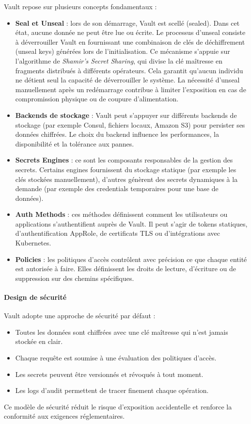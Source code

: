 Vault repose sur plusieurs concepts fondamentaux :

\begin{itemize}
	\item \textbf{Seal et Unseal} : lors de son démarrage, Vault est scellé (sealed). Dans cet état, aucune donnée ne peut être lue ou écrite. Le processus d’unseal consiste à déverrouiller Vault en fournissant une combinaison de clés de déchiffrement (unseal keys) générées lors de l’initialisation. Ce mécanisme s’appuie sur l’algorithme de \emph{Shamir’s Secret Sharing}, qui divise la clé maîtresse en fragments distribués à différents opérateurs. Cela garantit qu’aucun individu ne détient seul la capacité de déverrouiller le système. La nécessité d’unseal manuellement après un redémarrage contribue à limiter l’exposition en cas de compromission physique ou de coupure d’alimentation.
	\item \textbf{Backends de stockage} : Vault peut s’appuyer sur différents backends de stockage (par exemple Consul, fichiers locaux, Amazon S3) pour persister ses données chiffrées. Le choix du backend influence les performances, la disponibilité et la tolérance aux pannes.
	\item \textbf{Secrets Engines} : ce sont les composants responsables de la gestion des secrets. Certains engines fournissent du stockage statique (par exemple les clés stockées manuellement), d’autres génèrent des secrets dynamiques à la demande (par exemple des credentials temporaires pour une base de données).
	\item \textbf{Auth Methods} : ces méthodes définissent comment les utilisateurs ou applications s’authentifient auprès de Vault. Il peut s’agir de tokens statiques, d’authentification AppRole, de certificats TLS ou d’intégrations avec Kubernetes.
	\item \textbf{Policies} : les politiques d’accès contrôlent avec précision ce que chaque entité est autorisée à faire. Elles définissent les droits de lecture, d’écriture ou de suppression sur des chemins spécifiques.
\end{itemize}

\paragraph{Design de sécurité}

Vault adopte une approche de sécurité par défaut :
\begin{itemize}
	\item Toutes les données sont chiffrées avec une clé maîtresse qui n’est jamais stockée en clair.
	\item Chaque requête est soumise à une évaluation des politiques d’accès.
	\item Les secrets peuvent être versionnés et révoqués à tout moment.
	\item Les logs d’audit permettent de tracer finement chaque opération.
\end{itemize}
Ce modèle de sécurité réduit le risque d’exposition accidentelle et renforce la conformité aux exigences réglementaires.

